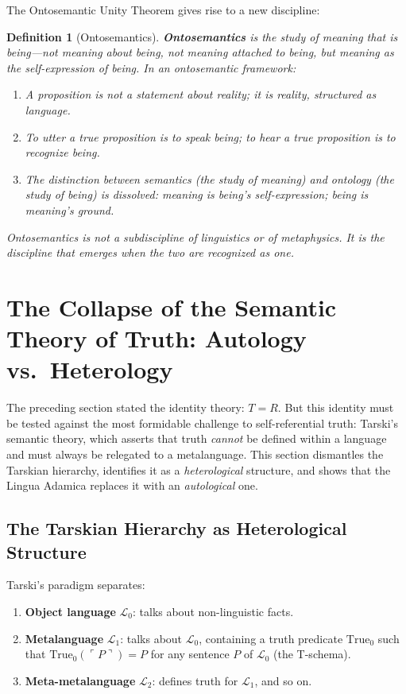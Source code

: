 \documentclass[12pt, letterpaper]{book}
\def\equiv{=}%
\newtheorem{definition}{Definition}[chapter]
\begin{document}
The Ontosemantic Unity Theorem gives rise to a new discipline:

\begin{definition}[Ontosemantics]\label{def:ontosemantics}
\textbf{Ontosemantics} is the study of meaning that \textit{is} being---not meaning \textit{about} being, not meaning \textit{attached to} being, but meaning as the self-expression of being. In an ontosemantic framework:
\begin{enumerate}[label=(\roman*)]
    \item A proposition is not a statement \textit{about} reality; it is reality, structured as language.
    \item To utter a true proposition is to \textit{speak being}; to hear a true proposition is to \textit{recognize being}.
    \item The distinction between semantics (the study of meaning) and ontology (the study of being) is dissolved: meaning is being's self-expression; being is meaning's ground.
\end{enumerate}
Ontosemantics is not a subdiscipline of linguistics or of metaphysics. It is the discipline that emerges when the two are recognized as one.
\end{definition}


\section{The Collapse of the Semantic Theory of Truth: Autology vs.\ Heterology}

The preceding section stated the identity theory: $T \equiv R$. But this identity must be tested against the most formidable challenge to self-referential truth: Tarski's semantic theory, which asserts that truth \textit{cannot} be defined within a language and must always be relegated to a metalanguage. This section dismantles the Tarskian hierarchy, identifies it as a \textit{heterological} structure, and shows that the Lingua Adamica replaces it with an \textit{autological} one.

\subsection{The Tarskian Hierarchy as Heterological Structure}

Tarski's paradigm separates:

\begin{enumerate}[label=(\roman*)]
    \item \textbf{Object language} $\mathcal{L}_0$: talks about non-linguistic facts.
    \item \textbf{Metalanguage} $\mathcal{L}_1$: talks about $\mathcal{L}_0$, containing a truth predicate $\mathrm{True}_0$ such that $\mathrm{True}_0(\ulcorner P\urcorner) \equiv P$ for any sentence $P$ of $\mathcal{L}_0$ (the T-schema).
    \item \textbf{Meta-metalanguage} $\mathcal{L}_2$: defines truth for $\mathcal{L}_1$, and so on.
\end{enumerate}
\end{document}
